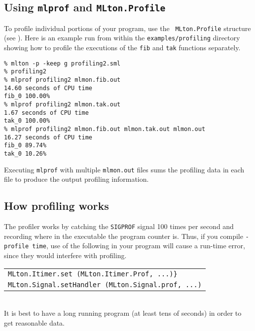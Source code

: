 \subsection{Using {\tt mlprof} and {\tt MLton.Profile}}
To profile individual portions of your program, use the {\tt
MLton.Profile} structure (see ).
Here is an example run from within the {\tt examples/profiling}
directory showing how to profile the executions of the {\tt fib} and
{\tt tak} functions separately.

\begin{verbatim}
% mlton -p -keep g profiling2.sml
% profiling2
% mlprof profiling2 mlmon.fib.out
14.60 seconds of CPU time
fib_0 100.00%
% mlprof profiling2 mlmon.tak.out
1.67 seconds of CPU time
tak_0 100.00%
% mlprof profiling2 mlmon.fib.out mlmon.tak.out mlmon.out
16.27 seconds of CPU time
fib_0 89.74%
tak_0 10.26%
\end{verbatim}

Executing {\tt mlprof} with multiple {\tt mlmon.out} files sums the
profiling data in each file to produce the output profiling
information.

\subsection{How profiling works}

The profiler works by catching the {\tt SIGPROF} signal 100 times per
second and recording where in the executable the program counter is.
Thus, if you compile {\tt -profile time}, use of the following in your
program will cause a run-time error, since they would interfere with
profiling.

\begin{tabular}{l}
\tt MLton.Itimer.set (MLton.Itimer.Prof, ...)\}\\
\tt MLton.Signal.setHandler (MLton.Signal.prof, ...)
\end{tabular}\\
It is best to have a long running program (at least tens of seconds)
in order to get reasonable data.
